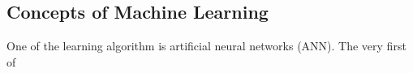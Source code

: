 \subsection{Concepts of Machine Learning}
One of the learning algorithm is artificial neural networks (ANN). The very first of 